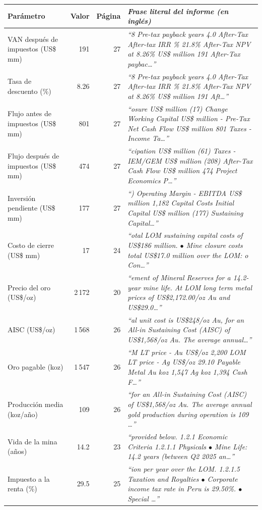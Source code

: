 \begin{tabularx}{\linewidth}{>{\raggedright\arraybackslash}p{3.6cm}rr>{\raggedright\arraybackslash\itshape}X}
\toprule
Parámetro & Valor & Página & Frase literal del informe (en inglés) \\
\midrule
VAN después de impuestos (US\$ mm) & 191 & 27 & \enquote{8 Pre-tax payback years 4.0 After-Tax After-tax IRR \% 21.8\% After-Tax NPV at 8.26\% US\$ million 191 After-Tax paybac\ldots} \\
Tasa de descuento (\%) & 8.26 & 27 & \enquote{8 Pre-tax payback years 4.0 After-Tax After-tax IRR \% 21.8\% After-Tax NPV at 8.26\% US\$ million 191 Aft\ldots} \\
Flujo antes de impuestos (US\$ mm) & 801 & 27 & \enquote{osure US\$ million (17) Change Working Capital US\$ million - Pre-Tax Net Cash Flow US\$ million 801 Taxes - Income Ta\ldots} \\
Flujo después de impuestos (US\$ mm) & 474 & 27 & \enquote{cipation US\$ million (61) Taxes - IEM/GEM US\$ million (208) After-Tax Cash Flow US\$ million 474 Project Economics P\ldots} \\
Inversión pendiente (US\$ mm) & 177 & 27 & \enquote{) Operating Margin - EBITDA US\$ million 1,182 Capital Costs Initial Capital US\$ million (177) Sustaining Capital\ldots} \\
Costo de cierre (US\$ mm) & 17 & 24 & \enquote{otal LOM sustaining capital costs of US\$186 million. $\bullet$ Mine closure costs total US\$17.0 million over the LOM: o Con\ldots} \\
Precio del oro (US\$/oz) & 2\,172 & 20 & \enquote{ement of Mineral Reserves for a 14.2-year mine life. At LOM long term metal prices of US\$2,172.00/oz Au and US\$29.0\ldots} \\
AISC (US\$/oz) & 1\,568 & 26 & \enquote{al unit cost is US\$248/oz Au, for an All-in Sustaining Cost (AISC) of US\$1,568/oz Au. The average annual\ldots} \\
Oro pagable (koz) & 1\,547 & 26 & \enquote{M LT price - Au US\$/oz 2,200 LOM LT price - Ag US\$/oz 29.10 Payable Metal Au koz 1,547 Ag koz 1,394 Cash F\ldots} \\
Producción media (koz/año) & 109 & 26 & \enquote{for an All-in Sustaining Cost (AISC) of US\$1,568/oz Au. The average annual gold production during operation is 109 \ldots} \\
Vida de la mina (años) & 14.2 & 23 & \enquote{provided below. 1.2.1 Economic Criteria 1.2.1.1 Physicals $\bullet$ Mine Life: 14.2 years (between Q2 2025 an\ldots} \\
Impuesto a la renta (\%) & 29.5 & 25 & \enquote{ion per year over the LOM. 1.2.1.5 Taxation and Royalties $\bullet$ Corporate income tax rate in Peru is 29.50\%. $\bullet$ Special \ldots} \\
\bottomrule
\end{tabularx}
